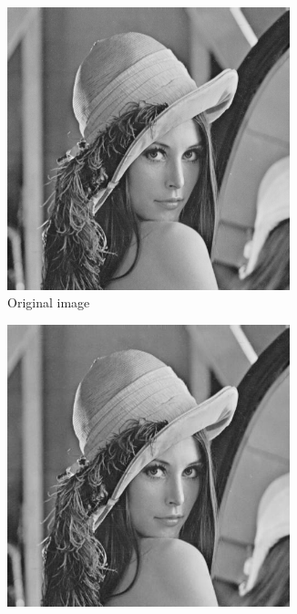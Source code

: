 \documentclass{homework}
\begin{document}
\begin{figure}[H]
    \centering
    \begin{subfigure}{0.32\textwidth}
        \centering
        \includegraphics[width=0.9\textwidth]{original_image.png}
        \caption{Original image}
    \end{subfigure}
    \begin{subfigure}{0.32\textwidth}
        \centering
        \includegraphics[width=0.9\textwidth]{reconstructed_image_Q1.png}

\end{subfigure}
\end{figure}
\end{document}
